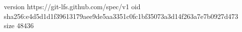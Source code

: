 version https://git-lfs.github.com/spec/v1
oid sha256:e4d5d1d1f39613179aee9de5aa3351c0fc1bf35073a3d14f263a7e7b0927d473
size 48436
